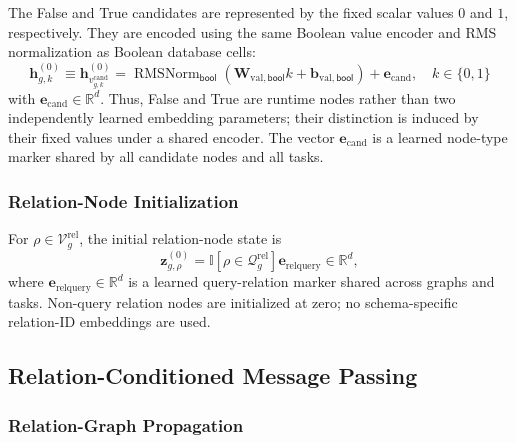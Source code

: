 \documentclass[11pt]{article}
\newcommand{\R}{\mathbb{R}}
\newcommand{\ind}{\mathbb{I}}
\newcommand{\rel}{\mathrm{rel}}
\DeclareMathOperator{\RMSNorm}{RMSNorm}
\begin{document}
The False and True candidates are represented by the fixed scalar values
\(0\) and \(1\), respectively.  They are encoded using the same Boolean
value encoder and RMS normalization as Boolean database cells:
\begin{equation}
    \boxed{
    \mathbf h_{g,k}^{(0)}
    \equiv
    \mathbf h_{v_{g,k}^{\mathrm{cand}}}^{(0)}
    =
    \RMSNorm_{\mathsf{bool}}
    \left(
        \mathbf W_{\mathrm{val},\mathsf{bool}}k
        +
        \mathbf b_{\mathrm{val},\mathsf{bool}}
    \right)
    +
    \mathbf e_{\mathrm{cand}},
    \quad
    k\in\{0,1\}
    }
    \label{eq:candidate-initialization}
\end{equation}
with \(\mathbf e_{\mathrm{cand}}\in\R^d\).  Thus, False and True are
runtime nodes rather than two independently learned embedding parameters;
their distinction is induced by their fixed values under a shared encoder.
The vector \(\mathbf e_{\mathrm{cand}}\) is a learned node-type marker shared
by all candidate nodes and all tasks.

\subsubsection{Relation-Node Initialization}
\label{sec:relation-node-init}

For \(\rho\in\mathcal V_g^{\rel}\), the initial relation-node state is
\begin{equation}
    \boxed{
    \mathbf z_{g,\rho}^{(0)}
    =
    \ind[\rho\in\mathcal Q_g^{\rel}]
    \mathbf e_{\mathrm{relquery}}
    }
    \in\R^d,
    \label{eq:relation-initialization}
\end{equation}
where \(\mathbf e_{\mathrm{relquery}}\in\R^d\) is a learned query-relation
marker shared across graphs and tasks.  Non-query relation nodes are
initialized at zero; no schema-specific relation-ID embeddings are used.


\subsection{Relation-Conditioned Message Passing}
\label{sec:message-passing}

\subsubsection{Relation-Graph Propagation}
\label{sec:relation-propagation}
\end{document}
